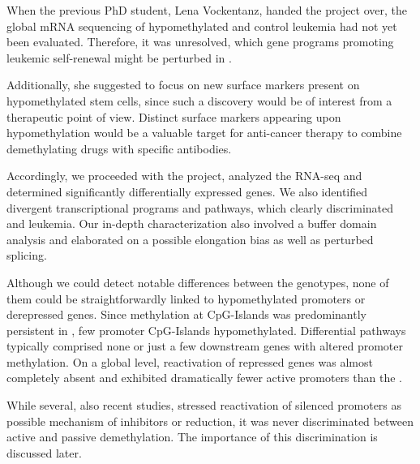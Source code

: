 When the previous PhD student, Lena Vockentanz, handed the project over,  the global mRNA sequencing of hypomethylated and control leukemia had not yet been evaluated. Therefore, it was unresolved, which gene programs promoting leukemic self-renewal might be perturbed in \dnmtchip. 

Additionally, she suggested to focus on new surface markers present on hypomethylated stem cells, since such a discovery would be of interest from a therapeutic point of view. Distinct surface markers appearing upon hypomethylation would be a valuable target for anti-cancer therapy to combine demethylating drugs with specific antibodies\cite{Vockentanz2011}.

Accordingly, we proceeded with the project, analyzed the RNA-seq and determined significantly differentially expressed genes. We also identified divergent transcriptional programs and pathways, which clearly discriminated \dnmtwt and \dnmtchip leukemia. Our in-depth characterization also involved a \hisfourthree buffer domain analysis and elaborated on a possible elongation bias as well as perturbed splicing.

Although we could detect notable differences between the genotypes, none of them could be straightforwardly linked to hypomethylated promoters or derepressed genes. Since methylation at CpG-Islands was predominantly persistent in \dnmtchip{}, few promoter CpG-Islands hypomethylated. Differential pathways typically comprised none or just a few downstream genes with altered promoter methylation. On a global level, reactivation of repressed genes was almost completely absent and \dnmtchip exhibited dramatically fewer active promoters than the \dnmtwt{}. 

While several, also recent studies, stressed reactivation of silenced promoters as possible mechanism of  inhibitors\cite{Cai2017,Brocks2017} or  reduction\cite{Trowbridge2012,He2017}, it was never discriminated between active and passive demethylation. The importance of this discrimination is discussed later.


